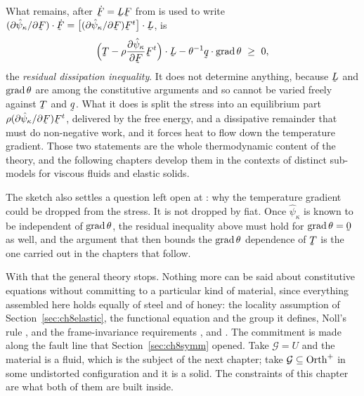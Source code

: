 \begin{remark}
What remains, after $\dot\bF=\bL\bF$ from  is used to write
$(\partial\hat\psi_{\kappa}/\partial\bF)\cdot\dot\bF=
\big[(\partial\hat\psi_{\kappa}/\partial\bF)\bF^{t}\big]\cdot\bL$, is
\[
   \Big(\bT-\rho\frac{\partial\hat\psi_{\kappa}}{\partial\bF}
   \bF^{t}\Big)\cdot\bL-\theta^{-1}\ip\bq{\grad\theta}\ \geq\ 0 ,
\]
the \emph{residual dissipation inequality}. It does not determine
anything, because $\bL$ and $\operatorname{grad}\theta$ are among the constitutive
arguments and so cannot be varied freely against $\bT$ and $\bq$. What
it does is split the stress into an equilibrium part
$\rho(\partial\hat\psi_{\kappa}/\partial\bF)\bF^{t}$, delivered by the
free energy, and a dissipative remainder that must do non-negative work,
and it forces heat to flow down the temperature gradient. Those two
statements are the whole thermodynamic content of the theory, and the
following chapters develop them in the contexts of distinct sub-models
for viscous fluids and elastic solids.

The sketch also settles a question left open at : why the
temperature gradient could be dropped from the stress. It is not dropped
by fiat. Once $\hat\psi_{\kappa}$ is known to be independent of
$\operatorname{grad}\theta$, the residual inequality above must hold for
$\grad\theta=\bze$ as well, and the argument that then bounds the
$\operatorname{grad}\theta$ dependence of $\bT$ is the one carried out in the chapters
that follow.
\end{remark}

With that the general theory stops. Nothing more can be said about
constitutive equations without committing to a particular kind of
material, since everything assembled here holds equally of steel and of
honey: the locality assumption of Section~\ref{sec:ch8elastic}, the
functional equation  and the group it defines, Noll's rule
, and the frame-invariance requirements ,
 and . The commitment is made along the fault line
that Section~\ref{sec:ch8symm} opened. Take $\mathcal{G}=U$ and the
material is a fluid, which is the subject of the next chapter; take
$\mathcal{G}\subseteq\operatorname{Orth}^{+}$ in some undistorted configuration and it
is a solid. The constraints of this chapter are what both of them are
built inside.
